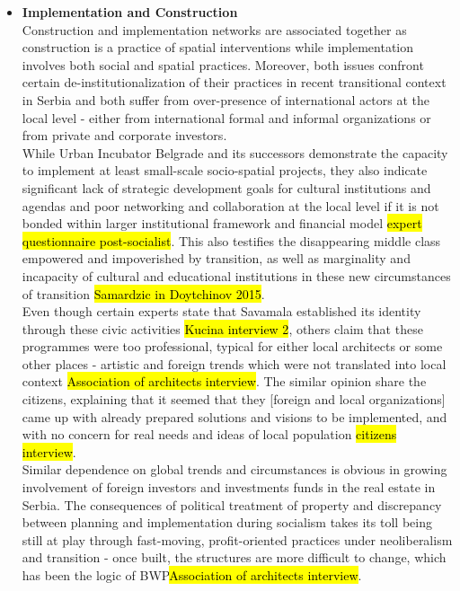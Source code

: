 \documentclass[11pt]{report}
\begin{document}
\begin{itemize}
\item \textbf{Implementation and Construction}
\\
Construction and implementation networks are associated together as construction is a practice of spatial interventions while implementation involves both social and spatial practices. Moreover, both issues confront certain de-institutionalization of their practices in recent transitional context in Serbia and both suffer from over-presence of international actors at the local level - either from international formal and informal organizations or from private and corporate investors.
\\
While Urban Incubator Belgrade and its successors demonstrate the capacity to implement at least small-scale socio-spatial projects, they also indicate significant lack of strategic development goals for cultural institutions and agendas and poor networking and collaboration at the local level if it is not bonded within larger institutional framework and financial model \hl{expert questionnaire post-socialist}.
This also testifies the disappearing middle class empowered and impoverished by transition, as well as marginality and incapacity of cultural and educational institutions in these new circumstances of transition \hl{Samardzic in Doytchinov 2015}.
\\
Even though certain experts state that Savamala established its identity through these civic activities \hl{Kucina interview 2}, others claim that these programmes were too professional, typical for either local architects or some other places - artistic and foreign trends which were not translated into local context \hl{Association of architects interview}.
The similar opinion share the citizens, explaining that it seemed that they [foreign and local organizations] came up with already prepared solutions and visions to be implemented, and with no concern for real needs and ideas of local population \hl{citizens interview}.
\\
Similar dependence on global trends and circumstances is obvious in growing involvement of foreign investors and investments funds in the real estate in Serbia. The consequences of political treatment of property and discrepancy between planning and implementation during socialism takes its toll being still at play through fast-moving, profit-oriented practices under neoliberalism and transition - once built, the structures are more difficult to change, which has been the logic of BWP\footnotemark \hl{Association of architects interview}.


\end{itemize}
\end{document}
